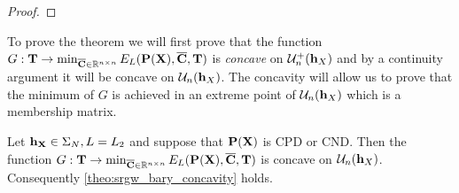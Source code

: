 \begin{proof}
\end{proof}

To prove the theorem we will first prove that the function $G: {\mathbf{T}} \to \min_{\overline{{\mathbf{C}}} \in \mathbb{R}^{n \times n}}  E_L({\mathbf{P}}({\mathbf{X}}), \overline{{\mathbf{C}}}, {\mathbf{T}})$ is \emph{concave} on ${\mathcal{U}}^{+}_n({\mathbf{h}}_X)$ and by a continuity argument it will be concave on ${\mathcal{U}}_n({\mathbf{h}}_X)$. The concavity will allow us to prove that the minimum of $G$ is achieved in an extreme point of ${\mathcal{U}}_n({\mathbf{h}}_X)$ which is a membership matrix.
\begin{proposition}
	\label{proposition:concavity}
	Let ${\mathbf{h}}_{\mathbf{X}} \in \Sigma_N, L=L_2$ and suppose that ${\mathbf{P}}({\mathbf{X}})$ is CPD or CND. Then the function $G: {\mathbf{T}} \to \min_{\overline{{\mathbf{C}}} \in \mathbb{R}^{n \times n}}  E_L({\mathbf{P}}({\mathbf{X}}), \overline{{\mathbf{C}}}, {\mathbf{T}})$ is concave on ${\mathcal{U}}_n({\mathbf{h}}_X)$. Consequently \cref{theo:srgw_bary_concavity} holds.
\end{proposition}
